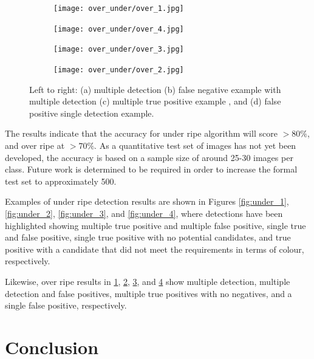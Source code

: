 \documentclass[fleqn,twoside,12pt]{report}
\begin{document}
\begin{figure}[h]
	\centering
	\begin{subfigure}{.5\textwidth}
		\centering
		\texttt{[image: over\_under/over\_1.jpg]}
		\caption{}
		\label{fig:over_1}
	\end{subfigure}%
	\begin{subfigure}{.5\textwidth}
		\centering
		\texttt{[image: over\_under/over\_4.jpg]}
		\caption{}
		\label{fig:over_2}
	\end{subfigure}%
	
	\begin{subfigure}{.5\textwidth}
		\centering
		\texttt{[image: over\_under/over\_3.jpg]}
		\caption{}
		\label{fig:over_3}
	\end{subfigure}%
	\begin{subfigure}{.5\textwidth}
		\centering
		\texttt{[image: over\_under/over\_2.jpg]}
		\caption{}
		\label{fig:over_4}
	\end{subfigure}%
	
	\caption{Left to right: (a) multiple detection (b) false negative example with multiple detection (c) multiple true positive example , and (d) false positive single detection example.}
	\label{}
\end{figure}


The results indicate that the accuracy for under ripe algorithm will score $>80\%$, and over ripe at $>70\%$. As a quantitative test set of images has not yet been developed, the accuracy is based on a sample size of around 25-30 images per class. Future work is determined to be required in order to increase the formal test set to approximately 500.   

Examples of under ripe detection results are shown in Figures \ref{fig:under_1}, \ref{fig:under_2}, \ref{fig:under_3}, and \ref{fig:under_4}, where detections have been highlighted showing multiple true positive and multiple false positive, single true and false positive, single true positive with no potential candidates, and true positive with a candidate that did not meet the requirements in terms of colour, respectively. 

Likewise, over ripe results in \ref{fig:over_1}, \ref{fig:over_2}, \ref{fig:over_3}, and \ref{fig:over_4} show multiple detection, multiple detection and false positives, multiple true positives with no negatives, and a single false positive, respectively. 

\section{Conclusion} 
\end{document}
